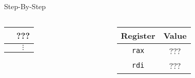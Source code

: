 \documentclass[hyphens,aspectratio=169]{beamer}
\begin{document}
\begin{frame}[fragile]{Step-By-Step}
\begin{columns}
\begin{column}{0.33\textwidth}
{\begin{tabular}{c|c|}
                & ??? \\
                \hline
                & $\vdots$
            \end{tabular}}
        \end{column}
        \begin{column}{0.33\textwidth}
            \begin{tabular}{| c | c |}
                \hline
                Register & Value \\
                \hline
                \texttt{rax} & ??? \\
                \hline
                \texttt{rdi} & ??? \\
                \hline
            \end{tabular}
        \end{column}
    \end{columns}
\end{frame}
\end{document}
